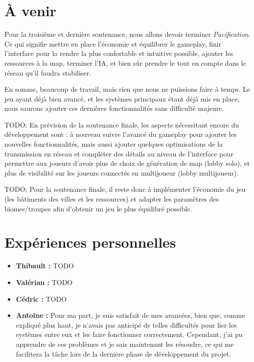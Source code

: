 \documentclass[12pt]{report}
\begin{document}
\chapter{À venir}

Pour la troisième et dernière soutenance, nous allons devoir terminer
\textit{Pacification}. Ce qui signifie mettre en place l'économie et équilibrer
le gameplay, finir l'interface pour la rendre la plus confortable et intuitive
possible, ajouter les ressources à la map, terminer l'IA, et bien sûr prendre
le tout en compte dans le réseau qu'il faudra stabiliser.

En somme, beaucoup de travail, mais rien que nous ne puissions faire à temps.
Le jeu ayant déjà bien avancé, et les systèmes principaux étant déjà mis en
place, nous saurons ajouter ces dernières fonctionnalités sans difficulté
majeure.

TODO: 
En prévision de la soutenance finale, les aspects nécessitant encore du
développement sont : à nouveau suivre l’avancé du gameplay pour ajouter les
nouvelles fonctionnalités, mais aussi ajouter quelques optimisations de la
transmission en réseau et compléter des détails au niveau de l’interface pour
permettre aux joueurs d’avoir plus de choix de génération de map (lobby solo),
et plus de visibilité sur les joueurs connectés en multijoueur (lobby
multijoueur).

TODO;
Pour la soutenance finale, il reste donc à implémenter l’économie du jeu (les
bâtiments des villes et les ressources) et adapter les paramètres des
biomes/troupes afin d’obtenir un jeu le plus équilibré possible.


\chapter{Expériences personnelles}

\begin{itemize}
	\item \textbf{Thibault :} TODO
        \item \textbf{Valérian :} TODO
	\item \textbf{Cédric :} TODO
    \item \textbf{Antoine :} Pour ma part, je suis satisfait de mes avancées,
    bien que, comme expliqué plus haut, je n'avais pas anticipé de telles
    difficultés pour lier les systèmes entre eux et les faire fonctionner
    correctement. Cependant, j'ai pu apprendre de ces problèmes et je sais
    maintenant les résoudre, ce qui me facilitera la tâche lors de la dernière
    phase de développement du projet.
\end{itemize}
\end{document}
